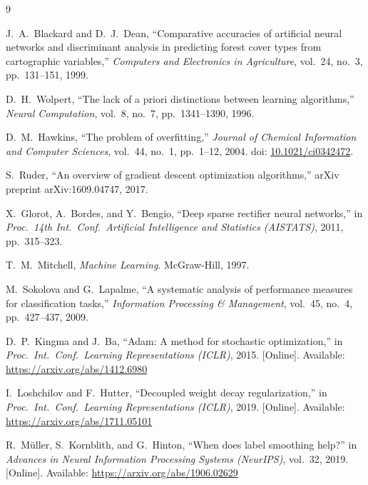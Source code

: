 \documentclass[conference]{IEEEtran}
\begin{document}
\begin{thebibliography}{9}

J.~A.~Blackard and D.~J.~Dean,
``Comparative accuracies of artificial neural networks and discriminant analysis
in predicting forest cover types from cartographic variables,''
\textit{Computers and Electronics in Agriculture}, vol.~24, no.~3,
pp.~131--151, 1999.

D.~H.~Wolpert,
``The lack of a priori distinctions between learning algorithms,''
\textit{Neural Computation}, vol.~8, no.~7, pp.~1341--1390, 1996.

D.~M.~Hawkins,
``The problem of overfitting,''
\textit{Journal of Chemical Information and Computer Sciences},
vol.~44, no.~1, pp.~1--12, 2004.
doi: \href{https://doi.org/10.1021/ci0342472}{10.1021/ci0342472}.

S.~Ruder,
``An overview of gradient descent optimization algorithms,''
arXiv preprint arXiv:1609.04747, 2017.

X.~Glorot, A.~Bordes, and Y.~Bengio,
``Deep sparse rectifier neural networks,''
in \textit{Proc.\ 14th Int.\ Conf.\ Artificial Intelligence and Statistics
(AISTATS)}, 2011, pp.~315--323.

T.~M.~Mitchell,
\textit{Machine Learning}.
McGraw-Hill, 1997.

M.~Sokolova and G.~Lapalme,
``A systematic analysis of performance measures for classification tasks,''
\textit{Information Processing \& Management}, vol.~45, no.~4,
pp.~427--437, 2009.

D.~P.~Kingma and J.~Ba,
``Adam: A method for stochastic optimization,''
in \textit{Proc.\ Int.\ Conf.\ Learning Representations (ICLR)}, 2015.
[Online]. Available: \url{https://arxiv.org/abs/1412.6980}

I.~Loshchilov and F.~Hutter,
``Decoupled weight decay regularization,''
in \textit{Proc.\ Int.\ Conf.\ Learning Representations (ICLR)}, 2019.
[Online]. Available: \url{https://arxiv.org/abs/1711.05101}

R.~M\"{u}ller, S.~Kornblith, and G.~Hinton,
``When does label smoothing help?''
in \textit{Advances in Neural Information Processing Systems (NeurIPS)},
vol.~32, 2019.
[Online]. Available: \url{https://arxiv.org/abs/1906.02629}

\end{thebibliography}
\end{document}
